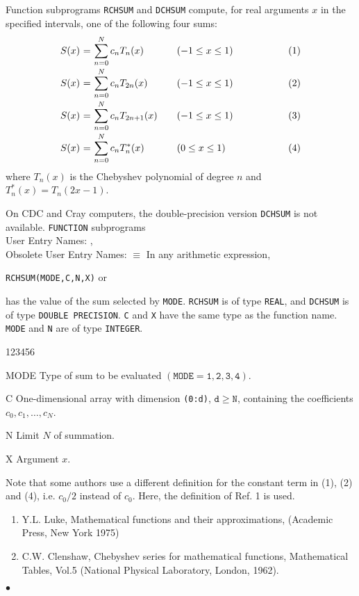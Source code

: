                             
                      
\Submitter{}                                
                     
Function subprograms {\tt RCHSUM} and {\tt DCHSUM} compute, for real
arguments $x$ in the specified intervals, one of the following four sums:
$$ \begin{array}{r@{ \ = \ }l@{\qquad}l@{\mbox{\hspace{20mm}}}l}
S(x) & \displaystyle \sum^N_{n=0}c_nT_n(x) & (-1\leq x\leq 1) & (1)
\\ [4mm]
S(x) & \displaystyle \sum^N_{n=0}c_nT_{2n}(x) & (-1\leq x\leq 1) & (2)
\\ [4mm]
S(x) & \displaystyle \sum^N_{n=0}c_nT_{2n+1}(x) & (-1\leq x\leq 1) & (3)
\\ [4mm]
S(x) & \displaystyle \sum^N_{n=0}c_n T_n^*(x) & (0\leq x\leq 1) & (4)
\end{array} $$
where $T_n(x)$ is the Chebyshev polynomial of degree $n$ and
$T_n^*(x) = T_n(2x - 1)$.
\par
On CDC and Cray computers, the double-precision version {\tt DCHSUM}
is not available.
\Structure
{\tt FUNCTION} subprograms \\
User Entry Names: ,  \\
Obsolete User Entry Names:  $\equiv$ 
\Usage
In any arithmetic expression,
\begin{center}
{\tt RCHSUM(MODE,C,N,X)} \qquad or 
\end{center}
has the value of the sum selected by {\tt MODE}.
{\tt RCHSUM} is of type {\tt REAL}, and {\tt DCHSUM} is of type
{\tt DOUBLE PRECISION}. {\tt C} and {\tt X} have the same type as the
function name. {\tt MODE} and {\tt N} are of type {\tt INTEGER}.
\begin{DLtt}{123456}
\item[MODE] Type of sum to be evaluated $(\mathtt{MODE = 1,2,3,4})$.
\item[C] One-dimensional array with dimension {\tt (0:d)},
$\mathtt{d \geq N}$, containing the coefficients \\
$c_0,c_1,\ldots,c_N$.
\item[N] Limit $N$ of summation.
\item[X] Argument $x$.
\end{DLtt}
\Notes
Note that some authors use a different definition for the
constant term in (1), (2) and (4), i.e. $c_0/2$ instead of $c_0$.
Here, the definition of Ref. 1 is used.
\Refer
\begin{enumerate}
\item Y.L. Luke, Mathematical functions and their approximations,
(Academic Press, New York 1975)
\item C.W. Clenshaw, Chebyshev series for mathematical functions,
Mathematical Tables, Vol.5 (National Physical Laboratory, London, 1962).
\end{enumerate}
$\bullet$
 
